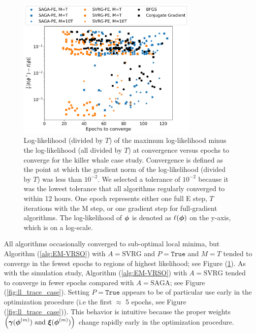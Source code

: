 \begin{figure}[h]
    \centering
    \includegraphics[width=3.5in]{../plt/scatterplot_case_study.png}
    \caption{Log-likelihood (divided by $T$) of the maximum log-likelihood minus the log-likelihood (all divided by $T$) at convergence versus epochs to converge for the killer whale case study. Convergence is defined as the point at which the gradient norm of the log-likelihood (divided by $T$) was less than $10^{-2}$. We selected a tolerance of $10^{-2}$ because it was the lowest tolerance that all algorithms regularly converged to within 12 hours. One epoch represents either one full E step, $T$ iterations with the M step, or one gradient step for full-gradient algorithms. The log-likelihood of $\boldsymbol{\phi}$ is denoted as $\ell(\boldsymbol{\phi})$ on the y-axis, which is on a log-scale.}
    \label{fig:scatterplot_case}
\end{figure}
%
All algorithms occasionally converged to sub-optimal local minima, but Algorithm (\ref{alg:EM-VRSO}) with $A = \text{SVRG}$ and $P=\texttt{True}$ and $M=T$ tended to converge in the fewest epochs to regions of highest likelihood; see Figure (\ref{fig:scatterplot_case}). As with the simulation study, Algorithm (\ref{alg:EM-VRSO}) with $A = \text{SVRG}$ tended to converge in fewer epochs compared with $A=\text{SAGA}$; see Figure (\ref{fig:ll_trace_case}). Setting $P = \texttt{True}$ appears to be of particular use early in the optimization procedure (i.e the first $\approx$ 5 epochs, see Figure (\ref{fig:ll_trace_case})). This behavior is intuitive because the proper weights $\left(\boldsymbol{\gamma}(\boldsymbol{\phi}^{(m)}) ~ \text{and} ~ \boldsymbol{\xi}(\boldsymbol{\phi}^{(m)})\right)$ change rapidly early in the optimization procedure. 


